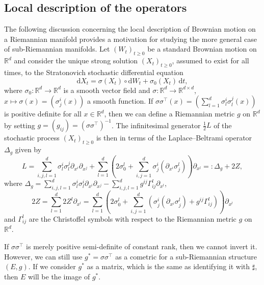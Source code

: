 \documentclass[10pt]{amsart}
\theoremstyle{remark}
\newcommand{\R}{\mathbb{R}}
\newcommand{\dd}{\,{\mathrm d}}
\newcommand{\db}{{\mathrm d}}
\numberwithin{equation}{section}
\begin{document}
\subsection{Local description of the operators}
The following discussion concerning the local description of Brownian motion on a Riemannian manifold provides a motivation for studying the more general case of sub-Riemannian manifolds. Let $(W_t)_{t\geq 0}$ be a standard Brownian motion on $\mathbb{R}^d$ and consider the unique strong solution $(X_t)_{t\geq 0}$, assumed to exist for all times, to the Stratonovich stochastic differential equation
\begin{equation*}
\db X_t = \sigma(X_t) \circ \db W_t + \sigma_0(X_t) \dd t, \end{equation*}
where $\sigma_0 \colon \mathbb{R}^d \to \mathbb{R}^d$ is a smooth vector field and $\sigma\colon\mathbb{R}^d \to \mathbb{R}^{d\times d}$, $x \mapsto \sigma(x) = (\sigma^i_{j}(x))$ a smooth function. If $\sigma \sigma^\top(x) = (\sum_{l=1}^d \sigma^i_{l}\sigma^j_{l}(x))$ is positive definite for all $x\in\R^d$, then we can define a Riemannian metric $g$ on $\R^d$ by setting $g = (g_{ij}) = (\sigma \sigma^\top )^{-1}$. The infinitesimal generator $\frac{1}{2} L$ of the stochastic process $(X_t)_{t\geq 0}$ is then in terms of the Laplace--Beltrami operator $\Delta_g$ given by
$$L = \sum_{i,j,l=1}^d \sigma^i_{l} \sigma^j_{l}\partial_{x^i} \partial_{x^j} + \sum_{l=1}^d \left(2\sigma_0^l + \sum_{i,j=1}^d  \sigma^i_{j} (\partial_{x^i} \sigma^l_{j}) \right)\partial_{x^l} =: \Delta_g + 2Z,$$
where $\Delta_g = \sum_{i,j,l=1}^d \sigma_l^i \sigma_l^i \partial_{x^i} \partial_{x^j} -\sum_{i,j,l=1}^d g^{ij} \Gamma_{ij}^l \partial_{x^l}$,
\begin{displaymath}
    2Z = \sum_{l=1}^d 2Z^l \partial_{x^l} = \sum_{l=1}^d \left( 2 \sigma^l_0 + \sum_{i,j=1}^d \left(   \sigma^i_{j} (\partial_{x^i} \sigma^l_{j}) +g^{ij} \Gamma_{ij}^l   \right)    \right) \partial_{x^l}
\end{displaymath}
and $\Gamma_{ij}^l$ are the Christoffel symbols with respect to the Riemannian metric $g$ on $\R^d$.
 
If $\sigma \sigma^\top$ is merely positive semi-definite of constant rank, then we cannot invert it. However, we can still use $g^* = \sigma \sigma^\top$ as a cometric for a sub-Riemannian structure $(E,g)$. If we consider $g^*$ as a matrix, which is the same as identifying it with $\sharp$, then $E$ will be the image of $g^*$.
\end{document}
